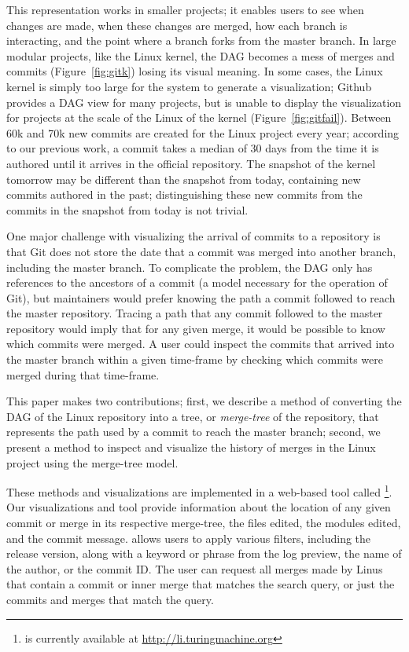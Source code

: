 This representation works in smaller projects; it enables users to see
when changes are made, when these changes are merged, how each branch is
interacting, and the point where a branch forks from the master branch.
In large modular projects, like the Linux kernel, the DAG becomes a mess
of merges and commits (Figure~\ref{fig:gitk}) losing its visual meaning.
In some cases, the Linux kernel is simply too large for the system to
generate a visualization; Github provides a DAG view for many projects,
but is unable to display the visualization for projects at the scale of
the Linux of the kernel (Figure~\ref{fig:gitfail}).  Between 60k and 70k
new commits are created for the Linux project every year; according to
our previous work\cite{German2015}, a commit takes a median of 30 days
from the time it is authored until it arrives in the official
repository. The snapshot of the kernel tomorrow may be different than
the snapshot from today, containing new commits authored in the past;
distinguishing these new commits from the commits in the snapshot from
today is not trivial.


One major challenge with visualizing the arrival of commits to a
repository is that Git does not store the date that a commit was merged
into another branch, including the master branch. To complicate the
problem, the DAG only has references to the ancestors of a commit (a
model necessary for the operation of Git), but maintainers would prefer
knowing the path a commit followed to reach the master repository.
Tracing a path that any commit followed to the master repository would
imply that for any given merge, it would be possible to know which
commits were merged. A user could inspect the commits that arrived into
the master branch within a given time-frame by checking which commits
were merged during that time-frame.

This paper makes two contributions; first, we describe a method of
converting the DAG of the Linux repository into a tree, or
\emph{merge-tree} of the repository, that represents the path used by a
commit to reach the master branch; second, we present a method to
inspect and visualize the history of merges in the Linux project using
the merge-tree model.

These methods and visualizations are implemented in a web-based tool
called \tool\footnote{\tool is currently available at
  \url{http://li.turingmachine.org}}.  Our visualizations and tool
provide information about the location of any given commit or merge in
its respective merge-tree, the files edited, the modules edited, and the
commit message. \tool allows users to apply various filters, including
the release version, along with a keyword or phrase from the log
preview, the name of the author, or the commit ID. The user can request
all merges made by Linus that contain a commit or inner merge that
matches the search query, or just the commits and merges that match the
query.

